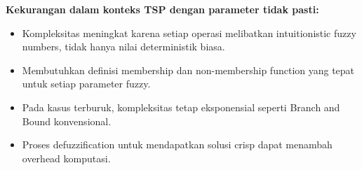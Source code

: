 \textbf{Kekurangan dalam konteks TSP dengan parameter tidak pasti:}
\begin{itemize}
    \item Kompleksitas meningkat karena setiap operasi melibatkan intuitionistic fuzzy numbers, tidak hanya nilai deterministik biasa.
    \item Membutuhkan definisi membership dan non-membership function yang tepat untuk setiap parameter fuzzy.
    \item Pada kasus terburuk, kompleksitas tetap eksponensial seperti Branch and Bound konvensional.
    \item Proses defuzzification untuk mendapatkan solusi crisp dapat menambah overhead komputasi.
\end{itemize}
